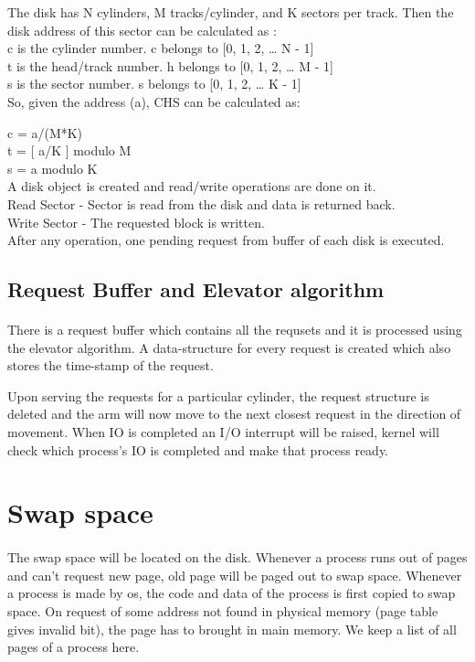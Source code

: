 \documentclass[11pt]{article}
\begin{document}
The disk has N cylinders, M tracks/cylinder, and K sectors per track. Then the disk address of this sector can be calculated as :
\\
c is the cylinder number. c belongs to [0, 1, 2, … N - 1] \\
t is the head/track number. h belongs to [0, 1, 2, … M - 1] \\
s is the sector number. s belongs to  [0, 1, 2, … K - 1] \\

So, given the address (a), CHS can be calculated as:

c = a/(M*K)\\
t = [ a/K ] modulo M\\
s = a modulo K\\

A disk object is created and read/write operations are done on it.\\
Read Sector -  Sector is read from the disk and data is returned back.\\
Write Sector - The requested block is written.\\

After any operation, one pending request from buffer of each disk is executed.

\subsection{Request Buffer and Elevator algorithm}
\paragraph{}

There is a request buffer which contains all the requsets and it is processed using the elevator algorithm.
A data-structure for every request is created which also stores the time-stamp of the request.

Upon serving the requests for a particular cylinder, the request structure is deleted and the arm will now move to the next closest request in the direction of movement. When IO is completed an I/O interrupt will be raised, kernel will check which process's IO is completed and make that process ready.

\section{Swap space}
\paragraph{}
The swap space will be located on the disk. Whenever a process runs out of pages and can't request new page, old page will be paged out to swap space. Whenever a process is made by os, the code and data of the process is first copied to swap space. On request of some address not found in physical memory (page table gives invalid bit), the page has to brought in main memory. We keep a list of all pages of a process here.
\end{document}
